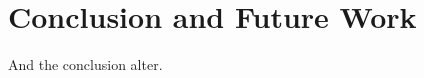 
\chapter{Conclusion and Future Work}
\label{chap:conclusion_future_work}

And the conclusion alter.